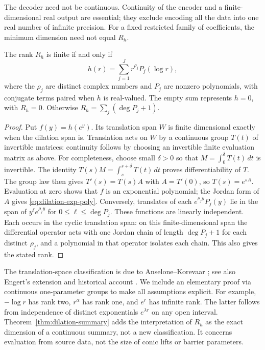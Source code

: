 The decoder need not be continuous. Continuity of the encoder and a
finite-dimensional real output are essential; they exclude encoding all
the data into one real number of infinite precision. For a fixed
restricted family of coefficients, the minimum dimension need not equal
$R_h$.

\begin{proposition}
\label{prop:dilation-classification}
The rank $R_h$ is finite if and only if
\begin{equation}\label{eq:dilation-exp-poly}
 h(r)=\sum_{j=1}^J r^{\rho_j}P_j(\log r),
\end{equation}
where the $\rho_j$ are distinct complex numbers and $P_j$ are nonzero
polynomials, with conjugate terms paired when $h$ is real-valued.
The empty sum represents $h=0$, with $R_h=0$. Otherwise
$R_h=\sum_j(\deg P_j+1)$.
\end{proposition}
\begin{proof}
Put $f(y)=h(e^y)$. Its translation span $W$ is finite dimensional
exactly when the dilation span is. Translation acts on $W$ by a
continuous group $T(t)$ of invertible matrices: continuity follows by
choosing an invertible finite evaluation matrix as above. For completeness,
choose small $\delta>0$ so that $M=\int_0^\delta T(t)\,dt$ is invertible.
The identity
$T(s)M=\int_s^{s+\delta}T(t)\,dt$ proves differentiability of $T$.
The group law then gives $T'(s)=T(s)A$ with $A=T'(0)$, so $T(s)=e^{sA}$.
Evaluation at zero shows that $f$ is an exponential polynomial; the
Jordan form of $A$ gives \eqref{eq:dilation-exp-poly}. Conversely,
translates of each $e^{\rho_j y}P_j(y)$ lie in the span of
$y^\ell e^{\rho_j y}$ for $0\leq\ell\leq\deg P_j$. These functions
are linearly independent. Each occurs in the cyclic translation span:
on this finite-dimensional span the differential operator acts with
one Jordan chain of length $\deg P_j+1$ for each distinct $\rho_j$,
and a polynomial in that operator isolates each chain. This also gives
the stated rank.
\end{proof}

The translation-space classification is due to Anselone--Korevaar
\cite{AnseloneKorevaar1964}; see also Engert's extension and historical
account \cite{Engert1970}. We include an elementary proof via
continuous one-parameter groups to make all assumptions explicit. For example, $-\log r$
has rank two, $r^\alpha$ has rank one, and $e^r$ has infinite rank.
The latter follows from independence of distinct exponentials
$e^{\lambda r}$ on any open interval. Theorem~\ref{thm:dilation-summary} adds the interpretation of $R_h$ as
the exact dimension of a continuous summary, not a new classification.
It concerns evaluation from source data, not the size of conic lifts or
barrier parameters.

